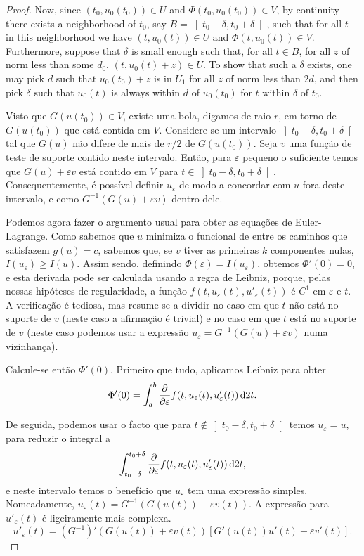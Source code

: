 \documentclass{article}
\theoremstyle{plain}
\theoremstyle{nonumberplain}
\newtheorem{proof}{Proof}
\begin{document}
\begin{proof}
Now, since $(t_0, u_0(t_0)) \in U$ and $\Phi(t_0, u_0(t_0)) \in V$, by continuity there exists a neighborhood of $t_0$, say $B = \left]t_0 - \delta, t_0 + \delta\right[$, such that for all $t$ in this neighborhood we have $(t,u_0(t)) \in U$ and $\Phi(t,u_0(t)) \in V$. Furthermore, suppose that $\delta$ is small enough such that, for all $t \in B$, for all $z$ of norm less than some $d_0$, $(t,u_0(t) + z) \in U$. To show that such a $\delta$ exists, one may pick $d$ such that $u_0(t_0) + z$ is in $U_1$ for all $z$ of norm less than $2d$, and then pick $\delta$ such that $u_0(t)$ is always within $d$ of $u_0(t_0)$ for $t$ within $\delta$ of $t_0$.

Visto que $G(u(t_0)) \in V$, existe uma bola, digamos de raio $r$, em torno de $G(u(t_0))$ que está contida em $V$. Considere-se um intervalo $\left]t_0-\delta, t_0 + \delta\right[$ tal que $G(u)$ não difere de mais de $r/2$ de $G(u(t_0))$. Seja $v$ uma função de teste de suporte contido neste intervalo. Então, para $\varepsilon$ pequeno o suficiente temos que $G(u) + \varepsilon v$ está contido em $V$ para $t \in \left]t_0-\delta,t_0+\delta\right[$. Consequentemente, é possível definir $u_\varepsilon$ de modo a concordar com $u$ fora deste intervalo, e como $G^{-1}(G(u) + \varepsilon v)$ dentro dele.

Podemos agora fazer o argumento usual para obter as equações de Euler-Lagrange. Como sabemos que $u$ minimiza o funcional de entre os caminhos que satisfazem $g(u) = c$, sabemos que, se $v$ tiver as primeiras $k$ componentes nulas, $I(u_\varepsilon) \geq I(u)$. Assim sendo, definindo $\Phi(\varepsilon) = I(u_\varepsilon)$, obtemos $\Phi'(0) = 0$, e esta derivada pode ser calculada usando a regra de Leibniz, porque, pelas nossas hipóteses de regularidade, a função $f(t, u_\varepsilon(t), u'_\varepsilon(t))$ é $C^1$ em $\varepsilon$ e $t$. A verificação é tediosa, mas resume-se a dividir no caso em que $t$ não está no suporte de $v$ (neste caso a afirmação é trivial) e no caso em que $t$ está no suporte de $v$ (neste caso podemos usar a expressão $u_\varepsilon = G^{-1}(G(u) + \varepsilon v)$ numa vizinhança).

Calcule-se então $\Phi'(0)$. Primeiro que tudo, aplicamos Leibniz para obter
\[\Phi'(0) = \int_a^b \diffp*{f(t, u_\varepsilon(t), u'_\varepsilon(t))}\varepsilon \dl2 t.\]

De seguida, podemos usar o facto que para $t \not \in \left]t_0-\delta,t_0+\delta\right[$ temos $u_\varepsilon = u$, para reduzir o integral a
\[\int_{t_0 - \delta}^{t_0 + \delta} \diffp*{f(t, u_\varepsilon(t), u'_\varepsilon(t))}\varepsilon \dl2 t,\]
e neste intervalo temos o benefício que $u_\varepsilon$ tem uma expressão simples. Nomeadamente, $u_\varepsilon(t) = G^{-1}(G(u(t)) + \varepsilon v(t))$. A expressão para $u'_\varepsilon(t)$ é ligeiramente mais complexa.
\[u'_\varepsilon(t) = (G^{-1})'(G(u(t)) + \varepsilon v(t)) [G'(u(t)) u'(t) + \varepsilon v'(t)].\]


\end{proof}
\end{document}
